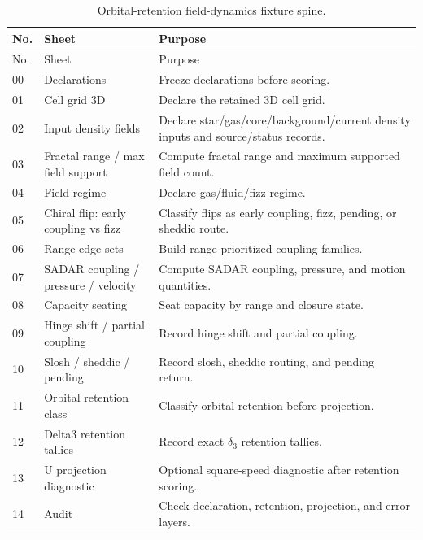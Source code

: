 \small
\begin{longtable}{@{}p{}p{}p{}@{}}
\caption{Orbital-retention field-dynamics fixture spine.}\label{tab:orbital-retention-fixture-spine}\\
\toprule
No. & Sheet & Purpose\\
\midrule
\endfirsthead
\toprule
No. & Sheet & Purpose\\
\midrule
\endhead
00 & Declarations & Freeze declarations before scoring.\\
01 & Cell grid 3D & Declare the retained 3D cell grid.\\
02 & Input density fields & Declare star/gas/core/background/current density inputs and source/status records.\\
03 & Fractal range / max field support & Compute fractal range and maximum supported field count.\\
04 & Field regime & Declare gas/fluid/fizz regime.\\
05 & Chiral flip: early coupling vs fizz & Classify flips as early coupling, fizz, pending, or sheddic route.\\
06 & Range edge sets & Build range-prioritized coupling families.\\
07 & SADAR coupling / pressure / velocity & Compute SADAR coupling, pressure, and motion quantities.\\
08 & Capacity seating & Seat capacity by range and closure state.\\
09 & Hinge shift / partial coupling & Record hinge shift and partial coupling.\\
10 & Slosh / sheddic / pending & Record slosh, sheddic routing, and pending return.\\
11 & Orbital retention class & Classify orbital retention before projection.\\
12 & Delta3 retention tallies & Record exact \(\delta_3\) retention tallies.\\
13 & U projection diagnostic & Optional square-speed diagnostic after retention scoring.\\
14 & Audit & Check declaration, retention, projection, and error layers.\\
\bottomrule
\end{longtable}
\normalsize


